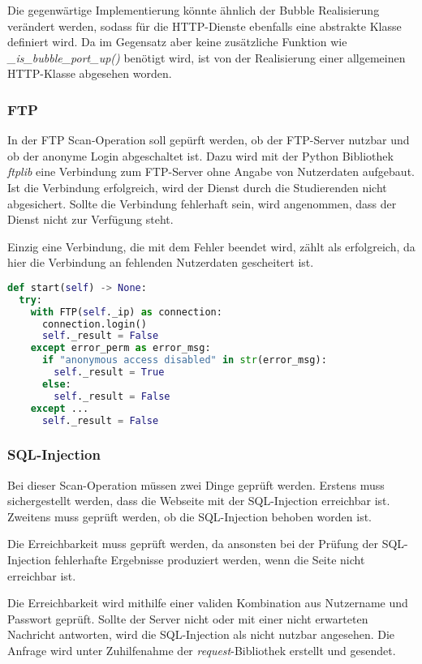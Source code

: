 Die gegenwärtige Implementierung könnte ähnlich der Bubble Realisierung verändert werden, sodass für die HTTP-Dienste ebenfalls eine abstrakte Klasse definiert wird. Da im Gegensatz aber keine zusätzliche Funktion wie \textit{\_is\_bubble\_port\_up()} benötigt wird, ist von der Realisierung einer allgemeinen HTTP-Klasse abgesehen worden.

\subsubsection{FTP}
In der FTP Scan-Operation soll gepürft werden, ob der FTP-Server nutzbar und ob der anonyme Login abgeschaltet ist. Dazu wird mit der Python Bibliothek \textit{ftplib} eine Verbindung zum FTP-Server ohne Angabe von Nutzerdaten aufgebaut. Ist die Verbindung erfolgreich, wird der Dienst durch die Studierenden nicht abgesichert. Sollte die Verbindung fehlerhaft sein, wird angenommen, dass der Dienst nicht zur Verfügung steht. 

Einzig eine Verbindung, die mit dem Fehler  beendet wird, zählt als erfolgreich, da hier die Verbindung an fehlenden Nutzerdaten gescheitert ist.
 
\begin{lstlisting}[language=Python, frame=single, caption={Big Brother FTP Scan-Operation}, captionpos=b, label={lst:bigbrother-ftp-save}]
def start(self) -> None:
  try:
    with FTP(self._ip) as connection:
      connection.login()
      self._result = False
    except error_perm as error_msg:
      if "anonymous access disabled" in str(error_msg):
        self._result = True
      else:
        self._result = False
    except ...
      self._result = False
\end{lstlisting} 

\subsubsection{SQL-Injection}

Bei dieser Scan-Operation müssen zwei Dinge geprüft werden. Erstens muss sichergestellt werden, dass die Webseite mit der SQL-Injection erreichbar ist. Zweitens muss geprüft werden, ob die SQL-Injection behoben worden ist. 

Die Erreichbarkeit muss geprüft werden, da ansonsten bei der Prüfung der SQL-Injection fehlerhafte Ergebnisse produziert werden, wenn die Seite nicht erreichbar ist.

Die Erreichbarkeit wird mithilfe einer validen Kombination aus Nutzername und Passwort geprüft. Sollte der Server nicht oder mit einer nicht erwarteten Nachricht antworten, wird die SQL-Injection als nicht nutzbar angesehen. Die Anfrage wird unter Zuhilfenahme der \textit{request}-Bibliothek erstellt und gesendet. 

